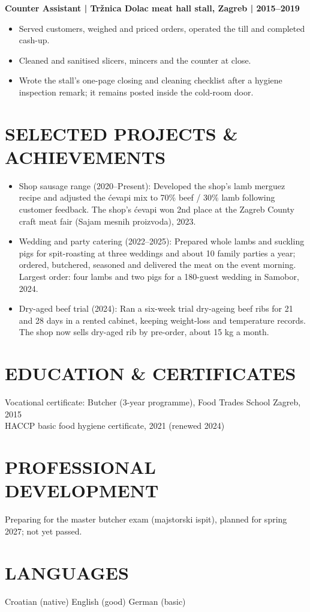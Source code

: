 \documentclass[11pt,a4paper]{article}
\begin{document}
\textbf{Counter Assistant | Tržnica Dolac meat hall stall, Zagreb | 2015–2019}
\begin{itemize}
\item Served customers, weighed and priced orders, operated the till and completed cash-up.
\item Cleaned and sanitised slicers, mincers and the counter at close.
\item Wrote the stall's one-page closing and cleaning checklist after a hygiene inspection remark; it remains posted inside the cold-room door.
\end{itemize}

\section*{SELECTED PROJECTS \& ACHIEVEMENTS}
\begin{itemize}
\item Shop sausage range (2020–Present): Developed the shop's lamb merguez recipe and adjusted the ćevapi mix to 70\% beef / 30\% lamb following customer feedback. The shop's ćevapi won 2nd place at the Zagreb County craft meat fair (Sajam mesnih proizvoda), 2023.
\item Wedding and party catering (2022–2025): Prepared whole lambs and suckling pigs for spit-roasting at three weddings and about 10 family parties a year; ordered, butchered, seasoned and delivered the meat on the event morning. Largest order: four lambs and two pigs for a 180-guest wedding in Samobor, 2024.
\item Dry-aged beef trial (2024): Ran a six-week trial dry-ageing beef ribs for 21 and 28 days in a rented cabinet, keeping weight-loss and temperature records. The shop now sells dry-aged rib by pre-order, about 15 kg a month.
\end{itemize}

\section*{EDUCATION \& CERTIFICATES}
Vocational certificate: Butcher (3-year programme), Food Trades School Zagreb, 2015\\
HACCP basic food hygiene certificate, 2021 (renewed 2024)

\section*{PROFESSIONAL DEVELOPMENT}
Preparing for the master butcher exam (majstorski ispit), planned for spring 2027; not yet passed.

\section*{LANGUAGES}
Croatian (native) \textbar{} English (good) \textbar{} German (basic)
\end{document}
